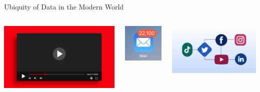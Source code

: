 \documentclass[aspectratio=169,xcolor=dvipsnames,svgnames,x11names,fleqn]{beamer}
\begin{document}
\begin{frame}{Ubiquity of Data in the Modern World}
\begin{columns}[c]
        \includegraphics[width=.99\textwidth]{figures/video.png}

        \includegraphics[width=.99\textwidth]{figures/email.jpeg}
        
        \includegraphics[width=.99\textwidth]{figures/social.jpg}


\end{columns}
\end{frame}
\end{document}
